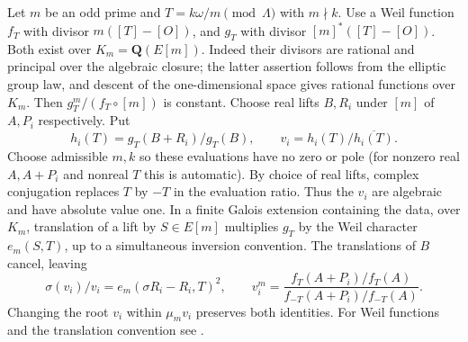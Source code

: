\documentclass[11pt]{article}
\newcommand{\Q}{\mathbf Q}\newcommand{\R}{\mathbf R}\newcommand{\Z}{\mathbf Z}
\begin{document}
Let \(m\) be an odd prime and \(T=k\omega/m\pmod\Lambda\) with \(m\nmid k\).
Use a Weil function \(f_T\) with divisor \(m([T]-[O])\), and \(g_T\) with
divisor \([m]^*([T]-[O])\). Both exist over \(K_m=\Q(E[m])\).
Indeed their divisors are rational and principal over the algebraic closure;
the latter assertion follows from the elliptic group law, and descent
of the one-dimensional space gives rational functions over \(K_m\).
Then \(g_T^m/(f_T\circ[m])\) is constant. Choose real lifts \(B,R_i\)
under \([m]\) of \(A,P_i\) respectively. Put
\[
 h_i(T)=g_T(B+R_i)/g_T(B),\qquad v_i=h_i(T)/\overline{h_i(T)} .
\]
Choose admissible \(m,k\) so these evaluations have no zero or pole
(for nonzero real \(A,A+P_i\) and nonreal \(T\) this is automatic).
By choice of real lifts, complex conjugation replaces \(T\) by \(-T\)
in the evaluation ratio. Thus the \(v_i\) are algebraic and have
absolute value one. In a finite Galois extension containing the data,
over \(K_m\), translation of a lift by \(S\in E[m]\) multiplies \(g_T\)
by the Weil character \(e_m(S,T)\), up to a simultaneous inversion
convention. The translations of \(B\) cancel, leaving
\begin{equation}\label{eq:weil}
 \sigma(v_i)/v_i=e_m(\sigma R_i-R_i,T)^2,\qquad
 v_i^m=\frac{f_T(A+P_i)/f_T(A)}{f_{-T}(A+P_i)/f_{-T}(A)} .
\end{equation}
Changing the root \(v_i\) within \(\mu_m v_i\) preserves both identities.
For Weil functions and the translation convention see \cite{Weil}.
\end{document}

